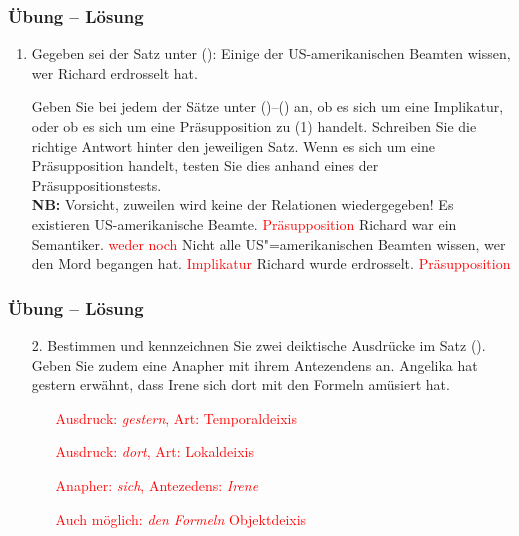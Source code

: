 
\begin{frame}
\frametitle{Übung -- Lösung}
		
		\begin{enumerate}
			\item Gegeben sei der Satz unter ():
			\ea
			Einige der US-amerikanischen Beamten wissen, wer Richard erdrosselt hat.
			\z
			\item [] Geben Sie bei jedem der Sätze unter ()--() an, ob es sich um eine Implikatur, oder ob es sich um eine Präsupposition zu (1) handelt. Schreiben Sie die richtige Antwort hinter den jeweiligen Satz. Wenn es sich um eine Präsupposition handelt, testen Sie dies anhand eines der Präsuppositionstests. \\
			\textbf{NB:} Vorsicht, zuweilen wird keine der Relationen wiedergegeben!
			\ea\label{l:ex:Prag43l} Es existieren US-amerikanische Beamte. \textcolor{red}{\ras Präsupposition}
			\ex\label{l:ex:Prag44l} Richard war ein Semantiker. \textcolor{red}{\ras weder noch}
			\ex\label{l:ex:Prag45l} Nicht alle US"=amerikanischen Beamten wissen, wer den Mord begangen hat. \textcolor{red}{\ras Implikatur}
			\ex\label{l:ex:Prag46l} Richard wurde erdrosselt. \textcolor{red}{\ras Präsupposition}
			\z	
		\end{enumerate}
		
	\end{frame}
	
	
	\begin{frame}
		\frametitle{Übung -- Lösung}
		
		\begin{enumerate}
			\item[2.] Bestimmen und kennzeichnen Sie zwei deiktische Ausdrücke im Satz (). Geben Sie zudem eine Anapher mit ihrem Antezendens an.
			\ea Angelika hat gestern erwähnt, dass Irene sich dort mit den Formeln amüsiert hat.
			\z 
			
			
			\begin{itemize}
				\item[] \textcolor{red}{Ausdruck: \emph{gestern}, Art: Temporaldeixis}
				\item[] \textcolor{red}{Ausdruck: \emph{dort}, Art: Lokaldeixis}
				\item[] \textcolor{red}{Anapher: \emph{sich}, Antezedens: \emph{Irene}}
				\item[] \textcolor{red}{Auch möglich: \emph{den Formeln} \ras Objektdeixis}
			\end{itemize}
			
		\end{enumerate}
		
	\end{frame}
	
